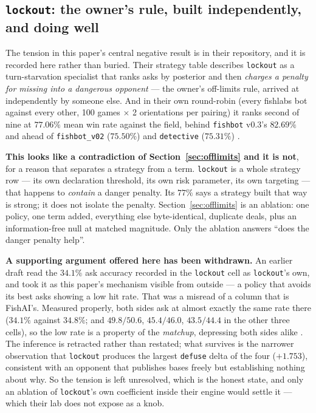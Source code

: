 \documentclass[11pt]{article}
\newcommand{\code}[1]{\texttt{#1}}
\begin{document}
\subsection{\code{lockout}: the owner's rule, built independently, and doing well}
\label{sec:lockout}

The tension in this paper's central negative result is in their repository, and it is recorded here
rather than buried. Their strategy table describes \code{lockout} as a turn-starvation specialist
that ranks asks by posterior and then \emph{charges a penalty for missing into a dangerous opponent}
--- the owner's off-limits rule, arrived at independently by someone else. And in their own
round-robin (every fishlabs bot against every other, 100 games $\times$ 2 orientations per pairing)
it ranks second of nine at $77.06\%$ mean win rate against the field, behind \code{fishbot} v0.3's
$82.69\%$ and ahead of \code{fishbot\_v02} ($75.50\%$) and \code{detective} ($75.31\%$)
\cite{crossplay,fishlabs}.

\textbf{This looks like a contradiction of Section~\ref{sec:offlimits} and it is not}, for a reason
that separates a strategy from a term. \code{lockout} is a whole strategy row --- its own
declaration threshold, its own risk parameter, its own targeting --- that happens to \emph{contain}
a danger penalty. Its $77\%$ says a strategy built that way is strong; it does not isolate the
penalty. Section~\ref{sec:offlimits} is an ablation: one policy, one term added, everything else
byte-identical, duplicate deals, plus an information-free null at matched magnitude. Only the
ablation answers ``does the danger penalty help''.

\textbf{A supporting argument offered here has been withdrawn.} An earlier draft read the $34.1\%$
ask accuracy recorded in the \code{lockout} cell as \code{lockout}'s own, and took it as this
paper's mechanism visible from outside --- a policy that avoids its best asks showing a low hit
rate. That was a misread of a column that is FishAI's. Measured properly, both sides ask at almost
exactly the same rate there ($34.1\%$ against $34.8\%$; and $49.8/50.6$, $45.4/46.0$, $43.5/44.4$ in
the other three cells), so the low rate is a property of the \emph{matchup}, depressing both sides
alike \cite{crossplay}. The inference is retracted rather than restated; what survives is the
narrower observation that \code{lockout} produces the largest \code{defuse} delta of the four
($+1.753$), consistent with an opponent that publishes bases freely but establishing nothing about
why. So the tension is left unresolved, which is the honest state, and only an ablation of
\code{lockout}'s own coefficient inside their engine would settle it --- which their lab does not
expose as a knob.
\end{document}
